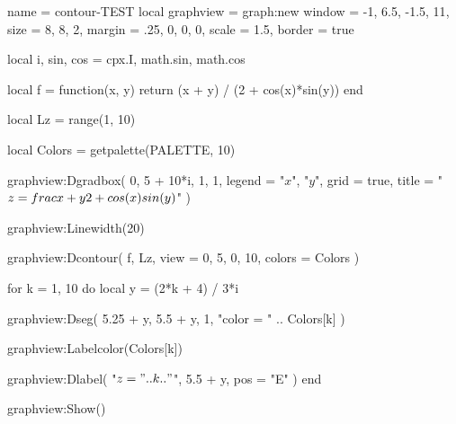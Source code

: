 \begin{luadraw}{name = contour-TEST}
local graphview = graph:new{
  window = {-1, 6.5, -1.5, 11},
  size   = {8, 8, 2},
  margin = {.25, 0, 0, 0},
  scale  = 1.5,
  border = true
}

local i, sin, cos = cpx.I, math.sin, math.cos

local f = function(x, y)
  return (x + y) / (2 + cos(x)*sin(y))
end

local Lz = range(1, 10)

local Colors = getpalette(PALETTE, 10)

graphview:Dgradbox(
  {0, 5 + 10*i, 1, 1},
  {
    legend = {"$x$", "$y$"},
    grid   = true,
    title  = "$z = \\frac{x + y}{2 + \\cos(x) \\sin(y)}$"
  }
)

graphview:Linewidth(20)

graphview:Dcontour(
  f,
  Lz,
  {
    view   = {0, 5, 0, 10},
    colors = Colors
  }
)

for k = 1, 10 do
  local y = (2*k + 4) / 3*i

  graphview:Dseg(
    {5.25 + y, 5.5 + y},
    1,
    "color = " .. Colors[k]
  )

  graphview:Labelcolor(Colors[k])

  graphview:Dlabel(
    "$z = " .. k .. "$",
    5.5 + y,
    {pos = "E"}
  )
end

graphview:Show()
\end{luadraw}


\bigskip


